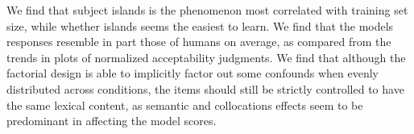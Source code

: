 We find that subject islands is the phenomenon most correlated with training set size, while whether islands seems the easiest to learn.%
We find that the models responses resemble in part those of humans on average, as compared from the trends in plots of normalized acceptability judgments. We find that although the factorial design is able to implicitly factor out some confounds when evenly distributed across conditions, the items should still be strictly controlled to have the same lexical content, as semantic and collocations effects seem to be predominant in affecting the model scores.
%
%
%
%
